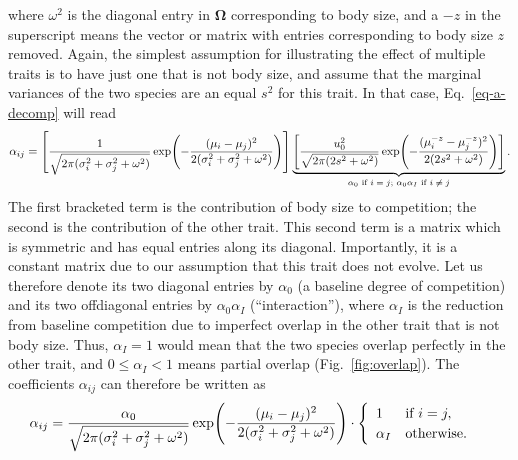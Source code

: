 \documentclass[9pt,twoside,lineno]{pnas-new}
\let\originalleft\left
\let\originalright\right
\renewcommand{\left}{\mathopen{}\mathclose\bgroup\originalleft}
\renewcommand{\right}{\aftergroup\egroup\originalright}
\newcommand{\mat}[1]{\bm{#1}}
\begin{document}
where $\omega^2$ is the diagonal entry in $\mat{\Omega}$ corresponding to body size, and a $-z$ in the superscript means the vector or matrix with entries corresponding to body size $z$ removed. Again, the simplest assumption for illustrating the effect of multiple traits is to have just one that is not body size, and assume that the marginal variances of the two species are an equal $s^2$ for this trait. In that case, Eq.~\ref{eq-a-decomp} will read
\begin{equation}
  \label{eq-a-prod}
  \alpha_{ij}
  = \left[
  \frac{1}{\sqrt{2\pi(\sigma_i^2 + \sigma_j^2 + \omega^2)}}
  \exp \left( -\frac{(\mu_i - \mu_j)^2}
  {2(\sigma_i^2 + \sigma_j^2 + \omega^2)} \right)
  \right] \underbrace{\left[
  \frac{u_0^2}{\sqrt{2\pi(2s^2 + \omega^2)}}
  \exp \left( -\frac{(\mu_i^{-z} - \mu_j^{-z})^2}
  {2(2s^2 + \omega^2)} \right)
  \right]}_{\text{$\alpha_0$ if $i = j$; $\alpha_0 \alpha_I$ if $i \ne j$}} .
\end{equation}
The first bracketed term is the contribution of body size to competition; the second is the contribution of the other trait. This second term is a matrix which is symmetric and has equal entries along its diagonal. Importantly, it is a constant matrix due to our assumption that this trait does not evolve. Let us therefore denote its two diagonal entries by $\alpha_0$ (a baseline degree of competition) and its two offdiagonal entries by $\alpha_0 \alpha_I$ (``interaction''), where $\alpha_I$ is the reduction from baseline competition due to imperfect overlap in the other trait that is not body size. Thus, $\alpha_I = 1$ would mean that the two species overlap perfectly in the other trait, and $0 \le \alpha_I < 1$ means partial overlap (Fig.~\ref{fig:overlap}). The coefficients $\alpha_{ij}$ can therefore be written as
\begin{equation}
  \label{eq-alphaN}
  \alpha_{ij}
  = \frac{\alpha_0}
  {\sqrt{2\pi(\sigma_i^2 + \sigma_j^2 + \omega^2)}}
  \exp \left( -\frac{(\mu_i - \mu_j)^2}
  {2(\sigma_i^2 + \sigma_j^2 + \omega^2)} \right)
  \cdot
  \begin{cases}
    \begin{array}{ll}
      1 & \text{if~} i = j, \\
      \alpha_I & \text{otherwise} .
    \end{array}
  \end{cases}
\end{equation}
\end{document}

